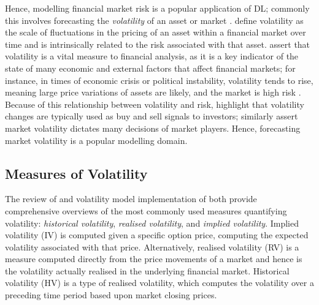 \documentclass[a4paper, 11pt]{report}
\begin{document}
    Hence, modelling financial market risk is a popular application of DL; commonly this involves forecasting the \emph{volatility} of an asset or market \citep{peng-2021}. \citet{cavalcante-2016} define volatility as the scale of fluctuations in the pricing of an asset within a financial market over time and is intrinsically related to the risk associated with that asset. \citet{cavalcante-2016} assert that volatility is a vital measure to financial analysis, as it is a key indicator of the state of many economic and external factors that affect financial markets; for instance, in times of economic crisis or political instability, volatility tends to rise, meaning large price variations of assets are likely, and the market is high risk \citep{sezer-2019}. Because of this relationship between volatility and risk, \citet{tino-2001} highlight that volatility changes are typically used as buy and sell signals to investors; \citet{ge-2022} similarly assert market volatility dictates many decisions of market players. Hence, forecasting market volatility is a popular modelling domain.

    \subsection{Measures of Volatility}

    The review of \citet{ge-2022} and volatility model implementation of \citet{tino-2001} both provide comprehensive overviews of the most commonly used measures quantifying volatility: \emph{historical volatility}, \emph{realised volatility}, and \emph{implied volatility}. Implied volatility (IV) is computed given a specific option price, computing the expected volatility associated with that price. Alternatively, realised volatility (RV) is a measure computed directly from the price movements of a market and hence is the volatility actually realised in the underlying financial market. Historical volatility (HV) is a type of realised volatility, which computes the volatility over a preceding time period based upon market closing prices.
\end{document}
